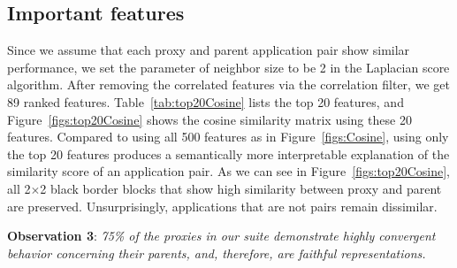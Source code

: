 \subsection{Important features}
Since we assume that %
each proxy and parent application pair show similar performance, we set the parameter of neighbor size to be 2 in the Laplacian score algorithm. After removing the correlated features via the correlation filter, we get 89 ranked features. Table~\ref{tab:top20Cosine} lists the top 20 features, and Figure~\ref{figs:top20Cosine} shows the cosine similarity matrix using these 20 features. Compared to using all 500 features as in Figure~\ref{figs:Cosine}, using only the top 20 features produces a semantically more interpretable explanation of the similarity score of an application pair. As we can see in Figure~\ref{figs:top20Cosine}, all 2$\times$2 black border blocks that show high similarity between proxy and parent are preserved. Unsurprisingly, applications that are not pairs remain dissimilar. %
\begin{mdframed}
\textbf{Observation 3}: \textit{75\% of the proxies in our suite demonstrate highly convergent behavior concerning their parents, and, therefore, are faithful representations.}
\end{mdframed}
